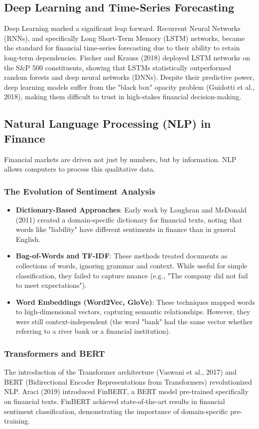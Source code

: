\subsection{Deep Learning and Time-Series Forecasting}
Deep Learning marked a significant leap forward. Recurrent Neural Networks (RNNs), and specifically Long Short-Term Memory (LSTM) networks, became the standard for financial time-series forecasting due to their ability to retain long-term dependencies.
Fischer and Krauss (2018) deployed LSTM networks on the S\&P 500 constituents, showing that LSTMs statistically outperformed random forests and deep neural networks (DNNs). Despite their predictive power, deep learning models suffer from the "black box" opacity problem (Guidotti et al., 2018), making them difficult to trust in high-stakes financial decision-making.

\subsection{Natural Language Processing (NLP) in Finance}
Financial markets are driven not just by numbers, but by information. NLP allows computers to process this qualitative data.
\subsubsection{The Evolution of Sentiment Analysis}
\begin{itemize}
    \item \textbf{Dictionary-Based Approaches}: Early work by Loughran and McDonald (2011) created a domain-specific dictionary for financial texts, noting that words like "liability" have different sentiments in finance than in general English.
    \item \textbf{Bag-of-Words and TF-IDF}: These methods treated documents as collections of words, ignoring grammar and context. While useful for simple classification, they failed to capture nuance (e.g., "The company did not fail to meet expectations").
    \item \textbf{Word Embeddings (Word2Vec, GloVe)}: These techniques mapped words to high-dimensional vectors, capturing semantic relationships. However, they were still context-independent (the word "bank" had the same vector whether referring to a river bank or a financial institution).
\end{itemize}

\subsubsection{Transformers and BERT}
The introduction of the Transformer architecture (Vaswani et al., 2017) and BERT (Bidirectional Encoder Representations from Transformers) revolutionized NLP. Araci (2019) introduced FinBERT, a BERT model pre-trained specifically on financial texts. FinBERT achieved state-of-the-art results in financial sentiment classification, demonstrating the importance of domain-specific pre-training.

